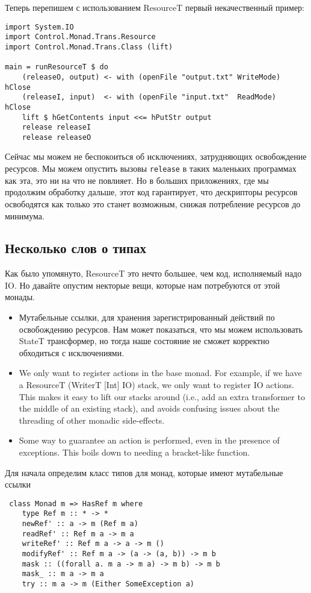 Теперь перепишем с использованием ResourceT первый некачественный пример:
\begin{lstlisting}
import System.IO
import Control.Monad.Trans.Resource
import Control.Monad.Trans.Class (lift)

main = runResourceT $ do
    (releaseO, output) <- with (openFile "output.txt" WriteMode) hClose
    (releaseI, input)  <- with (openFile "input.txt"  ReadMode)  hClose
    lift $ hGetContents input <<= hPutStr output
    release releaseI
    release releaseO
\end{lstlisting}

Сейчас мы можем не беспокоиться об исключениях, затрудняющих освобождение ресурсов. Мы
можем опустить вызовы \verb=release= в таких маленьких программах как эта, это ни на что
не повлияет. Но в больших приложениях, где мы продолжим обработку дальше, этот код
гарантирует, что дескрипторы ресурсов освободятся как только это станет возможным, снижая
потребление ресурсов до минимума.

\subsection{Несколько слов о типах}

Как было упомянуто, ResourceT это нечто большее, чем код, исполняемый надо IO. Но давайте
опустим некторые вещи, которые нам потребуются от этой монады.
\begin{itemize}
\item Мутабельные ссылки, для хранения зарегистрированный действий по освобождению
ресурсов.
Нам может показаться, что мы можем использовать StateT трансформер, но тогда наше
состояние не сможет корректно обходиться с исключениями.
\item We only want to register actions in the base monad. For example, if we have a
ResourceT (WriterT [Int] IO) stack, we only want to register
IO actions. This makes it easy to lift our stacks around (i.e., add an extra
transformer to the middle of an existing stack), and avoids confusing issues about the
threading
of other monadic side-effects.
\item Some way to guarantee an action is performed, even in the presence of exceptions.
This
boils
down to needing a bracket-like function.
\end{itemize}

Для начала определим класс типов для монад, которые имеют мутабельные ссылки
\begin{lstlisting}
 class Monad m => HasRef m where
    type Ref m :: * -> *
    newRef' :: a -> m (Ref m a)
    readRef' :: Ref m a -> m a
    writeRef' :: Ref m a -> a -> m ()
    modifyRef' :: Ref m a -> (a -> (a, b)) -> m b
    mask :: ((forall a. m a -> m a) -> m b) -> m b
    mask_ :: m a -> m a
    try :: m a -> m (Either SomeException a)
\end{lstlisting}

